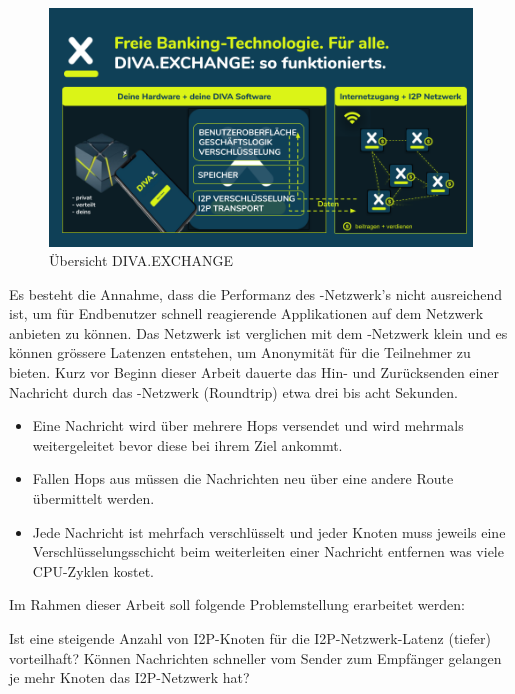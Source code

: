\begin{figure}[thp!]
    \includegraphics[width=1.0\textwidth]{img/divax-overview.png}
    \caption{Übersicht DIVA.EXCHANGE}\label{fig:divax_overview}
\end{figure}

Es besteht die Annahme, dass die Performanz des -Netzwerk's nicht ausreichend ist, um für Endbenutzer schnell reagierende Applikationen auf dem Netzwerk anbieten zu können.
Das Netzwerk ist verglichen mit dem -Netzwerk klein und es können grössere Latenzen entstehen, um Anonymität für die Teilnehmer zu bieten.
Kurz vor Beginn dieser Arbeit dauerte das Hin- und Zurücksenden einer Nachricht durch das -Netzwerk (Roundtrip) etwa drei bis acht Sekunden.

\begin{itemize}
    \item Eine Nachricht wird über mehrere Hops versendet und wird mehrmals weitergeleitet bevor diese bei ihrem Ziel ankommt.
    \item Fallen Hops aus müssen die Nachrichten neu über eine andere Route übermittelt werden.
    \item Jede Nachricht ist mehrfach verschlüsselt und jeder Knoten muss jeweils eine Verschlüsselungsschicht beim weiterleiten einer Nachricht entfernen was viele CPU-Zyklen kostet.
\end{itemize}

Im Rahmen dieser Arbeit soll folgende Problemstellung erarbeitet werden:

\begin{hyp} \label{hyp:first}
    Ist eine steigende Anzahl von I2P-Knoten für die I2P-Netzwerk-Latenz (tiefer) vorteilhaft?
    Können Nachrichten schneller vom Sender zum Empfänger gelangen je mehr Knoten das I2P-Netzwerk hat?
\end{hyp}

